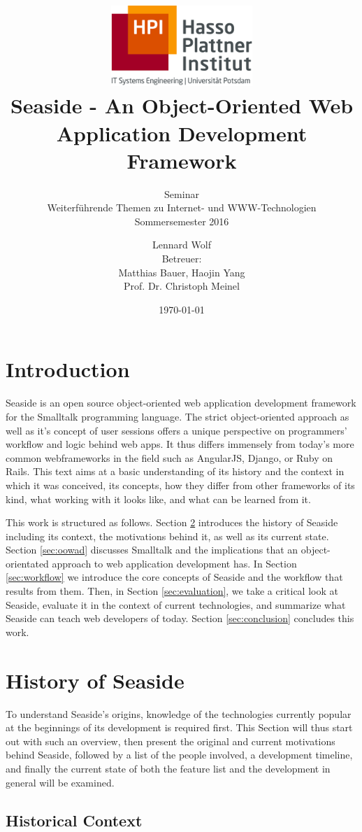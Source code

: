 \documentclass[a4paper,12pt,pagesize,headsepline,oribibl,titlepage]{scrartcl}
\title{
	\includegraphics*[width=0.4\textwidth]{hpi_logo.png}\\
	\vspace{24pt}
	 Seaside - An Object-Oriented Web Application Development Framework
}
\subtitle{
	Seminar\\
	Weiterführende Themen zu Internet- und WWW-Technologien\\
	Sommersemester 2016
}
\author{
	Lennard Wolf\\[12pt]
	Betreuer:\\
	Matthias Bauer, Haojin Yang\\
	Prof. Dr. Christoph Meinel
}
\date{\today}
\begin{document}
\maketitle
\tableofcontents
\newpage

\section{Introduction}
Seaside is an open source object-oriented web application development framework for the Smalltalk programming language. The strict object-oriented approach as well as it's concept of user sessions offers a unique perspective on programmers' workflow and logic behind web apps. It thus differs immensely from today's more common webframeworks in the field such as AngularJS, Django, or Ruby on Rails. This text aims at a basic understanding of its history and the context in which it was conceived, its concepts, how they differ from other frameworks of its kind, what working with it looks like, and what can be learned from it. 
\medskip

This work is structured as follows. Section \ref{sec:history} introduces the history of Seaside including its context, the motivations behind it, as well as its current state. Section \ref{sec:oowad} discusses Smalltalk and the implications that an object-orientated approach to web application development has. In Section \ref{sec:workflow} we introduce the core concepts of Seaside and the workflow that results from them. Then, in Section \ref{sec:evaluation}, we take a critical look at Seaside, evaluate it in the context of current technologies, and summarize what Seaside can teach web developers of today. Section \ref{sec:conclusion} concludes this work.


\section{History of Seaside}
\label{sec:history}
To understand Seaside's origins, knowledge of the technologies currently popular at the beginnings of its development is required first. This Section will thus start out with such an overview, then present the original and current motivations behind Seaside, followed by a list of the people involved, a development timeline, and finally the current state of both the feature list and the development in general will be examined.

\subsection{Historical Context}
\label{sec:context} 
\end{document}
